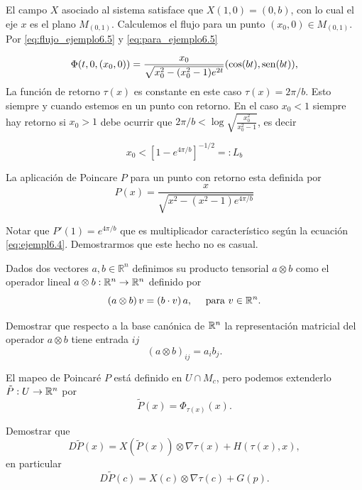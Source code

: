 \begin{ejemplo}{}
El campo $X$ asociado al sistema satisface que $X(1,0)=(0,b)$, con lo cual el eje $x$ es el plano $M_{(0,1)}$.  Calculemos el flujo para un punto $(x_0,0)\in M_{(0,1)}$. Por 
\eqref{eq:flujo_ejemplo6.5} y \eqref{eq:para_ejemplo6.5}

\[
  \Phi(t,0,(x_0,0))=\frac{x_0}{\sqrt{x_0^2-(x_0^2-1)e^{2t}}}(\cos(bt),\operatorname{sen}(bt)),
\]
La función de retorno $\tau(x)$ es constante en este caso $\tau(x)=2\pi/b$. Esto siempre y cuando estemos en un punto con retorno.  En el caso $x_0<1$ siempre hay retorno si $x_0>1$ debe ocurrir que $2\pi/b<\log\sqrt{\frac{x_0^2}{x_0^2-1}}$, es decir

\[x_0<[1-e^{4\pi/b}]^{-1/2}=: L_b\]

La aplicación de Poincare $P$ para un punto con retorno esta definida por
\[
  P(x)=\frac{x}{\sqrt{x^2-(x^2-1)e^{4\pi/b}}}
\]
\end{ejemplo}

Notar que $P'(1)=e^{4\pi/b}$ que es  multiplicador característico según la ecuación \eqref{eq:ejempl6.4}. Demostrarmos que este hecho no es casual.

\begin{definicion}{}
 Dados dos vectores $a,b\in\mathbb{R}^n$ definimos su producto tensorial $a\otimes b$ como el operador lineal  $a\otimes b:\mathbb{R}^n\to\mathbb{R}^n$ definido por
\[\left(a\otimes b\right)v=\left(b\cdot v\right)a,\quad \text{ para } v\in\mathbb{R}^n.\]
\end{definicion}


\begin{ejercicio}{}
  Demostrar que respecto a la base canónica de  $\mathbb{R}^n$ la representación matricial del operador $a\otimes b$ tiene entrada $ij$
\[\left(a\otimes b\right)_{ij}=a_ib_j.\]
\end{ejercicio}


El mapeo de Poincaré $P$ está definido en $U\cap M_c$, pero podemos extenderlo $\tilde{P}:U\to\mathbb{R}^n$ por
\[\tilde{P}(x)=\Phi_{\tau(x)}(x).\]





\begin{ejercicio}{} Demostrar que
\[D\tilde{P}(x)=X(\tilde{P}(x))\otimes\nabla\tau(x)+H(\tau(x),x),\]
en particular
\[D\tilde{P}(c)=X(c)\otimes\nabla\tau(c)+G(p).\]
\end{ejercicio}


